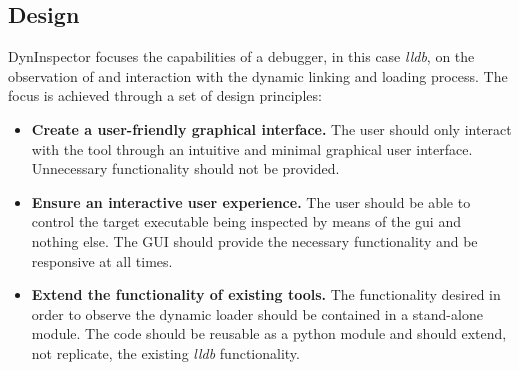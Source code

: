 \subsection{Design}

DynInspector focuses the capabilities of a debugger, in this case \textit{lldb}, on the observation of and interaction with the dynamic linking and loading process. The focus is achieved through a set of design principles:

\begin{itemize}
\item \textbf{Create a user-friendly graphical interface.} The user should only interact with the tool through an intuitive and minimal graphical user interface. Unnecessary functionality should not be provided.
\item \textbf{Ensure an interactive user experience.} The user should be able to control the target executable being inspected by means of the gui and nothing else. The GUI should provide the necessary functionality and be responsive at all times.
\item \textbf{Extend the functionality of existing tools.} The functionality desired in order to observe the dynamic loader should be contained in a stand-alone module. The code should be reusable as a python module and should extend, not replicate, the existing \textit{lldb} functionality.
\end{itemize}
